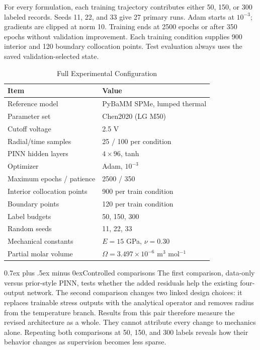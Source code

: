 \documentclass[conference]{IEEEtran}
\makeatletter
\newcommand{\headingfont}{\rmfamily}
\def\subsection{\@startsection{subsection}{2}{\z@}{1.5ex plus 1.5ex minus 0.5ex}%
{0.7ex plus .5ex minus 0ex}{\normalfont\headingfont\normalsize\bfseries}}
\makeatother
\begin{document}
For every formulation, each training trajectory contributes either 50, 150, or 300 labeled records. Seeds 11, 22, and 33 give 27 primary runs. Adam starts at $10^{-3}$; gradients are clipped at norm 10. Training ends at 2500 epochs or after 350 epochs without validation improvement. Each training condition supplies 900 interior and 120 boundary collocation points. Test evaluation always uses the saved validation-selected state.

\begin{table}[t]
\centering
\caption{Full Experimental Configuration}
\label{tab:config}
\footnotesize
\setlength{\tabcolsep}{3.5pt}
\begin{tabular}{p{}p{}}
\toprule
Item & Value \\
\midrule
Reference model & PyBaMM SPMe, lumped thermal \\
Parameter set & Chen2020 (LG M50) \\
Cutoff voltage & 2.5 V \\
Radial/time samples & 25 / 100 per condition \\
PINN hidden layers & $4\times96$, tanh \\
Optimizer & Adam, $10^{-3}$ \\
Maximum epochs / patience & 2500 / 350 \\
Interior collocation points & 900 per train condition \\
Boundary points & 120 per train condition \\
Label budgets & 50, 150, 300 \\
Random seeds & 11, 22, 33 \\
Mechanical constants & $E=15$ GPa, $\nu=0.30$ \\
Partial molar volume & $\Omega=3.497\times10^{-6}$ m$^3$ mol$^{-1}$ \\
\bottomrule
\end{tabular}
\end{table}

\subsection{Controlled comparisons}
The first comparison, data-only versus prior-style PINN, tests whether the added residuals help the existing four-output network. The second comparison changes two linked design choices: it replaces trainable stress outputs with the analytical operator and removes radius from the temperature branch. Results from this pair therefore measure the revised architecture as a whole. They cannot attribute every change to mechanics alone. Repeating both comparisons at 50, 150, and 300 labels reveals how their behavior changes as supervision becomes less sparse.
\end{document}
